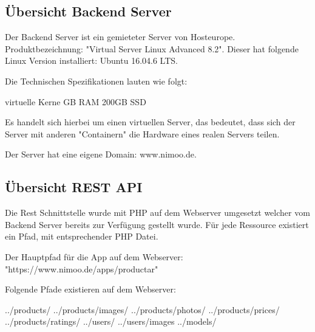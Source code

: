 \documentclass{scrartcl}
\begin{document}
\subsection{Übersicht Backend Server}

Der Backend Server ist ein gemieteter Server von Hosteurope. \newline
Produktbezeichnung: "Virtual Server Linux Advanced 8.2". \newline
Dieser hat folgende Linux Version installiert: Ubuntu 16.04.6 LTS. \newline \newline

\noindent Die Technischen Spezifikationen lauten wie folgt: \newline 

 virtuelle Kerne \newline
{} GB RAM \newline 
\noindent 200GB SSD \newline 

\noindent Es handelt sich hierbei um einen virtuellen Server, das bedeutet, dass sich der Server mit anderen "Containern" die Hardware eines realen Servers teilen. %
\newline

\noindent Der Server hat eine eigene Domain: www.nimoo.de. 

\newpage

\subsection{Übersicht REST API}

Die Rest Schnittstelle wurde mit PHP auf dem Webserver umgesetzt welcher vom Backend Server bereits zur Verfügung gestellt wurde. 
Für jede Ressource existiert ein Pfad, mit entsprechender PHP Datei. \newline 

\noindent Der Hauptpfad für die App auf dem Webserver: "https://www.nimoo.de/apps/productar" \newline

\noindent Folgende Pfade existieren auf dem Webserver: \newline

\noindent ../products/ \newline
\noindent ../products/images/ \newline
\noindent ../products/photos/ \newline
\noindent ../products/prices/ \newline
\noindent ../products/ratings/ \newline
\noindent ../users/ \newline
\noindent ../users/images \newline
\noindent ../models/ \newline
\end{document}
